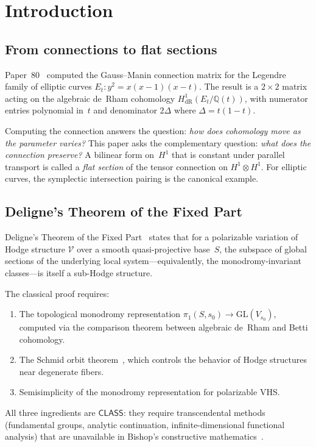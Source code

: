 \documentclass[11pt]{article}
\theoremstyle{plain}
\theoremstyle{definition}
\theoremstyle{remark}
\newcommand{\Q}{\mathbb{Q}}
\newcommand{\GL}{\mathrm{GL}}
\newcommand{\CLASS}{\mathsf{CLASS}}
\newcommand{\HdR}{H^1_{\mathrm{dR}}}
\begin{document}
\section{Introduction}\label{sec:intro}

\subsection{From connections to flat sections}

Paper~80~\cite{Paper80} computed the Gauss--Manin connection
matrix for the Legendre family of elliptic curves
$E_t : y^2 = x(x-1)(x-t)$.  The result is a $2 \times 2$
matrix acting on the algebraic de~Rham cohomology
$\HdR(E_t/\Q(t))$, with numerator entries polynomial in~$t$
and denominator $2\Delta$ where $\Delta = t(1-t)$.

Computing the connection answers the question:
\emph{how does cohomology move as the parameter varies?}
This paper asks the complementary question:
\emph{what does the connection preserve?}
A bilinear form on~$H^1$ that is constant under parallel
transport is called a \emph{flat section} of the tensor
connection on $H^1 \otimes H^1$.  For elliptic curves,
the symplectic intersection pairing is the canonical example.

\subsection{Deligne's Theorem of the Fixed Part}

Deligne's Theorem of the Fixed Part~\cite{Deligne1972}
states that for a polarizable variation of Hodge structure
$\mathcal{V}$ over a smooth quasi-projective base~$S$,
the subspace of global sections of the underlying local
system---equivalently, the monodromy-invariant
classes---is itself a sub-Hodge structure.

The classical proof requires:
\begin{enumerate}[nosep]
\item The topological monodromy representation
      $\pi_1(S, s_0) \to \GL(V_{s_0})$,
      computed via the comparison theorem between
      algebraic de~Rham and Betti cohomology.
\item The Schmid orbit theorem~\cite{Schmid1973},
      which controls the behavior of Hodge structures
      near degenerate fibers.
\item Semisimplicity of the monodromy representation
      for polarizable VHS.
\end{enumerate}
All three ingredients are $\CLASS$: they require
transcendental methods (fundamental groups, analytic
continuation, infinite-dimensional functional analysis)
that are unavailable in Bishop's constructive
mathematics~\cite{BridgesRichman1987}.
\end{document}
